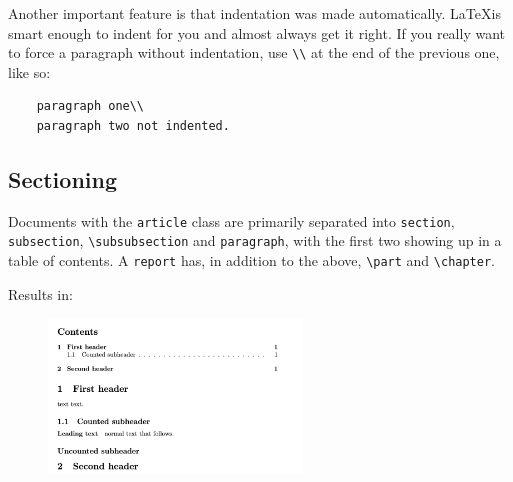 Another important feature is that indentation was made automatically.
\LaTeX is smart enough to indent for you and almost always get it right.
If you really want to force a paragraph without indentation, use \verb|\\| at the end of the previous one, like so:
\begin{lstlisting}
    paragraph one\\
    paragraph two not indented.
\end{lstlisting}

\subsection{Sectioning}
Documents with the \texttt{article} class are primarily separated into \verb|section|, \verb|subsection|, \verb|\subsubsection| and \verb|paragraph|, with the first two showing up in a table of contents.
A \texttt{report} has, in addition to the above, \verb|\part| and \verb|\chapter|.



Results in:
\begin{figure}[h]
    \centering
    \includegraphics[width=0.6\textwidth]{figures/sections.png}
    \label{fig:sections}
\end{figure}

